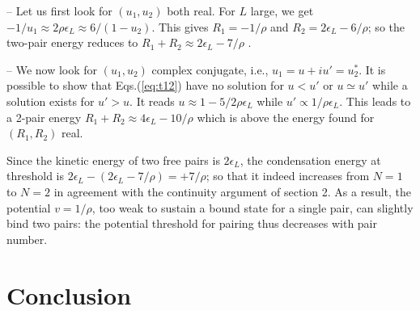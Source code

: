 \documentclass[5p,twocolumn]{elsarticle}
\begin{document}
-- Let us first look for $(u_1,u_2)$ both real. For $L$ large, we get $-1/u_1\approx 2 \rho\epsilon_L \approx 6/(1-u_2)$. This gives $R_1=-1/\rho$ and $R_2=2 \epsilon_L-6/\rho$; so the two-pair energy reduces to $R_1+R_2\approx2 \epsilon_L-7/\rho$ .

--  We now look for $(u_1,u_2)$ complex conjugate, i.e., $u_1=u+iu'=u^*_2$. It is possible to show that Eqs.(\ref{eq:t12}) have no solution for $u<u'$ or $u\simeq u'$ while a solution exists for $u'>u$. It reads $u\approx1-5/2\rho\epsilon_L$ while $u'\propto1/\rho\epsilon_L$. This leads to a 2-pair energy $R_1+R_2\approx4 \epsilon_L-10/\rho$ which is above the energy found for $(R_1,R_2)$ real.

Since the kinetic energy of two free pairs is $2\epsilon_L$, the condensation energy at threshold is 
$ 2\epsilon_L-(2 \epsilon_L-7/\rho)=+7/\rho$; so that it indeed increases from $N=1$ to $N=2$ in agreement with the continuity argument of section 2. As a result, the potential $v=1/\rho$, too weak to sustain a bound state for a single pair, can slightly bind two pairs: the potential threshold for pairing thus decreases with pair number.

 

\section{Conclusion\label{sec:conclusion}}



\end{document}

